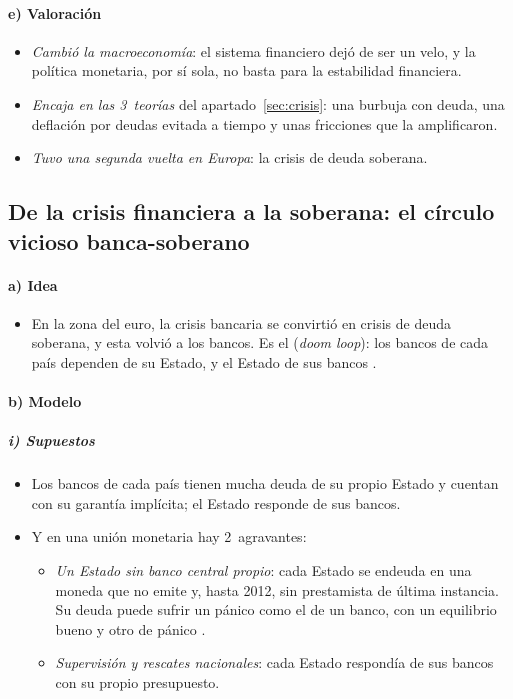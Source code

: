 \documentclass[11pt]{article}
\begin{document}
\paragraph{e) Valoración}

\begin{itemize}
\item \emph{Cambió la macroeconomía}: el sistema financiero dejó de ser un velo, y la política monetaria, por sí sola, no basta para la estabilidad financiera\nocite{BlanchardDellAricciaMauro2010}.
\item \emph{Encaja en las 3~teorías} del apartado~\ref{sec:crisis}: una burbuja con deuda, una deflación por deudas evitada a tiempo y unas fricciones que la amplificaron.
\item \emph{Tuvo una segunda vuelta en Europa}: la crisis de deuda soberana.
\end{itemize}

\subsection{De la crisis financiera a la soberana:\cortetitulo{} el círculo vicioso banca-soberano}\label{sec:circulo-vicioso}

\paragraph{a) Idea}

\begin{itemize}
\item En la zona del euro, la crisis bancaria se convirtió en crisis de deuda soberana, y esta volvió a los bancos. Es el  (\emph{doom loop}): los bancos de cada país dependen de su Estado, y el Estado de sus bancos\nocite{BrunnermeierEtAl2016} .
\end{itemize}

\paragraph{b) Modelo}

\subparagraph{i) Supuestos}

\begin{itemize}
\item Los bancos de cada país tienen mucha deuda de su propio Estado y cuentan con su garantía implícita; el Estado responde de sus bancos.
\item Y en una unión monetaria hay 2~agravantes:
  \begin{itemize}
  \item \emph{Un Estado sin banco central propio}: cada Estado se endeuda en una moneda que no emite y, hasta 2012, sin prestamista de última instancia. Su deuda puede sufrir un pánico como el de un banco, con un equilibrio bueno y otro de pánico\nocite{Calvo1988Servicing,DeGrauwe2011Governance} .
  \item \emph{Supervisión y rescates nacionales}: cada Estado respondía de sus bancos con su propio presupuesto.
  \end{itemize}
\end{itemize}
\end{document}
